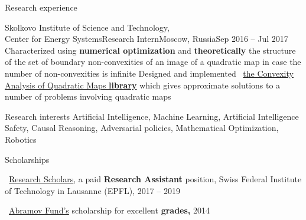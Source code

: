 \documentclass{resume} %
\newcommand{\mylink}{{\color{gray}\faExternalLink}}
\begin{document}
\begin{rSection}{Research experience}
	\begin{rSubsection}{Skolkovo Institute of Science and Technology, \\Center for Energy Systems}{Research Intern}{Moscow, Russia}{Sep 2016 -- Jul 2017}
		\myitem Characterized using {\bf numerical optimization} and {\bf theoretically} the structure of the set of boundary non-convexities of an image of a quadratic map in case the number of non-convexities is infinite
		\myitem Designed and implemented \mylink~\href{https://github.com/sergeivolodin/CAQM}{the Convexity Analysis of Quadratic Maps {\bf \color{black} library}} which gives approximate solutions to a number of problems involving quadratic maps
	\end{rSubsection}
	
	
\end{rSection}

\begin{rSection}{Research interests}
	Artificial Intelligence, Machine Learning, Artificial Intelligence Safety, Causal Reasoning, Adversarial policies, Mathematical Optimization, Robotics %
\end{rSection}

\begin{rSection}{Scholarships}
	\vspace{-1em}
	\item \mylink~\href{https://ic.epfl.ch/ResearchScholars}{Research Scholars}, a paid {\bf Research Assistant} position, Swiss Federal Institute of Technology in Lausanne (EPFL), 2017 -- 2019
	\item \mylink~\href{http://phystech-foundation.org/}{Abramov Fund's} scholarship for excellent {\bf grades,} 2014
\end{rSection}
\end{document}
